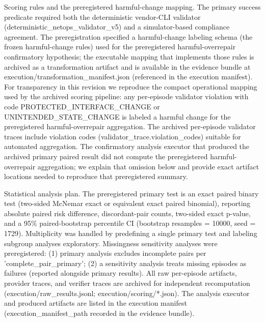 \documentclass[conference]{IEEEtran}
\begin{document}
Scoring rules and the preregistered harmful-change mapping. The primary success predicate required both the deterministic vendor-CLI validator (deterministic\_netops\_validator\_v5) and a simulator-based compliance agreement. The preregistration specified a harmful-change labeling schema (the frozen harmful-change rules) used for the preregistered harmful-overrepair confirmatory hypothesis; the executable mapping that implements those rules is archived as a transformation artifact and is available in the evidence bundle at execution/transformation\_manifest.json (referenced in the execution manifest). For transparency in this revision we reproduce the compact operational mapping used by the archived scoring pipeline: any per-episode validator violation with code PROTECTED\_INTERFACE\_CHANGE or UNINTENDED\_STATE\_CHANGE is labeled a harmful change for the preregistered harmful-overrepair aggregation. The archived per-episode validator traces include violation codes (validator\_trace.violation\_codes) suitable for automated aggregation. The confirmatory analysis executor that produced the archived primary paired result did not compute the preregistered harmful-overrepair aggregation; we explain that omission below and provide exact artifact locations needed to reproduce that preregistered summary.

Statistical analysis plan. The preregistered primary test is an exact paired binary test (two-sided McNemar exact or equivalent exact paired binomial), reporting absolute paired risk difference, discordant-pair counts, two-sided exact p-value, and a 95\% paired-bootstrap percentile CI (bootstrap resamples = 10000, seed = 1729). Multiplicity was handled by predefining a single primary test and labeling subgroup analyses exploratory. Missingness sensitivity analyses were preregistered: (1) primary analysis excludes incomplete pairs per 'complete\_pair\_primary'; (2) a sensitivity analysis treats missing episodes as failures (reported alongside primary results). All raw per-episode artifacts, provider traces, and verifier traces are archived for independent recomputation (execution/raw\_results.jsonl; execution/scoring/*.json). The analysis executor and produced artifacts are listed in the execution manifest (execution\_manifest\_path recorded in the evidence bundle).
\end{document}
